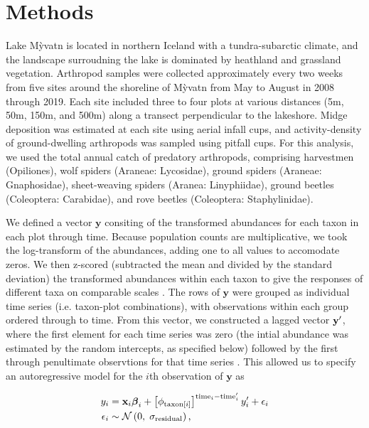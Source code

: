 

\section*{Methods}

Lake M\`{y}vatn is located in northern Iceland with a tundra-subarctic climate,
and the landscape surroudning the lake is dominated by heathland and grassland vegetation.
Arthropod samples were collected approximately every two weeks from five sites around the
shoreline of M\`{y}vatn from May to August in 2008 through 2019.
Each site included three to four plots at various distances
(5m, 50m, 150m, and 500m) along a transect perpendicular to the lakeshore.
Midge deposition was estimated at each site using aerial infall cups,
and activity-density of ground-dwelling arthropods was sampled using pitfall cups.
For this analysis, we used the total annual catch of predatory arthropods,
comprising harvestmen (Opiliones),
wolf spiders (Araneae: Lycosidae),
ground spiders (Araneae: Gnaphosidae),
sheet-weaving spiders (Aranea: Linyphiidae),
ground beetles (Coleoptera: Carabidae),
and rove beetles (Coleoptera: Staphylinidae).

We defined a vector $\mathbf{y}$ consiting of the transformed abundances for each taxon
in each plot through time.
Because population counts are multiplicative, we took the log-transform of the abundances,
adding one to all values to accomodate zeros.
We then z-scored (subtracted the mean and divided by the standard deviation)
the transformed abundances within each taxon
to give the responses of different taxa on comparable scales \citep{Jackson2012}.
The rows of $\mathbf{y}$ were grouped as individual time series
(i.e. taxon-plot combinations),
with observations within each group ordered through to time.
From this vector,
we constructed a lagged vector $\mathbf{y\sp{\prime}}$,
where the first element for each time series was zero
(the intial abundance was estimated by the random intercepts, as specified below)
followed by the first through
penultimate observtions for that time series \citep{Ives2006}.
This allowed us to specify an autoregressive model for the $i$th observation of
$\mathbf{y}$ as

\begin{equation} \label{eq:y-i}
\begin{split}
    y_i &= \mathbf{x}_i {\boldsymbol\beta}_i +
        \left[ \phi_{\text{taxon}[i]} \right]^{\text{time}_i - \text{time}\sp{\prime}_i}
        y\sp{\prime}_i + \epsilon_i \\
    \epsilon_i &\sim \mathcal{N} \left(0, \; \sigma_{\text{residual}} \right)
    \text{,}
\end{split}
\end{equation}


